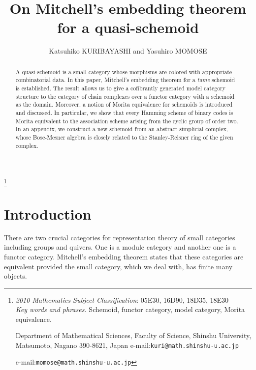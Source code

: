 \documentclass{amsart}
\theoremstyle{definition}
\theoremstyle{remark}
\begin{document}
\title{
On Mitchell's embedding theorem for a quasi-schemoid  \\
}

\footnote[0]{{\it 2010 Mathematics Subject Classification}: 05E30, 16D90, 18D35, 18E30  \\
{\it Key words and phrases.} 
Schemoid, functor category, model category, %
Morita equivalence. 




Department of Mathematical Sciences, 
Faculty of Science,  
Shinshu University,   
Matsumoto, Nagano 390-8621, Japan   
e-mail:{\tt kuri@math.shinshu-u.ac.jp} 

e-mail:{\tt momose@math.shinshu-u.ac.jp}
}

\author{Katsuhiko KURIBAYASHI and Yasuhiro MOMOSE}

\maketitle

\begin{abstract}
A quasi-schemoid is a small category whose morphisms are colored with appropriate combinatorial data. 
In this paper, Mitchell's embedding theorem for a {\it tame} schemoid is established. The result allows us to give 
a cofibrantly generated model category structure to the category of chain complexes over a functor category with 
a schemoid as the domain. 
Moreover, a notion of Morita equivalence for schemoids is introduced and discussed. 
In particular, we show that every Hamming scheme of binary codes is Morita equivalent to 
the association scheme arising from the cyclic group of order two. 
In an appendix, 
we construct a new schemoid from an abstract simplicial complex, whose Bose-Mesner algebra is closely related 
to the Stanley-Reisner ring of the given complex.  
\end{abstract}

\section{Introduction} There are two crucial categories for 
representation theory of small categories including groups and quivers. 
One is a module category and another one is a functor category. 
Mitchell's embedding theorem \cite[Theorem 7.1]{Mitchell} 
states that these categories are equivalent provided the small category, which we deal with, has finite many objects.  
\end{document}

